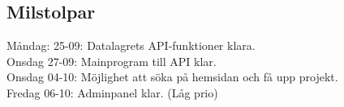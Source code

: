 \documentclass{TDP003mall}
\begin{document}
\subsection{Milstolpar}
Måndag: 25-09: Datalagrets API-funktioner klara.\\
Onsdag 27-09: Mainprogram till API klar.\\
Onsdag 04-10: Möjlighet att söka på hemsidan och få upp projekt.\\
Fredag 06-10: Adminpanel klar. (Låg prio)\\
\end{document}
